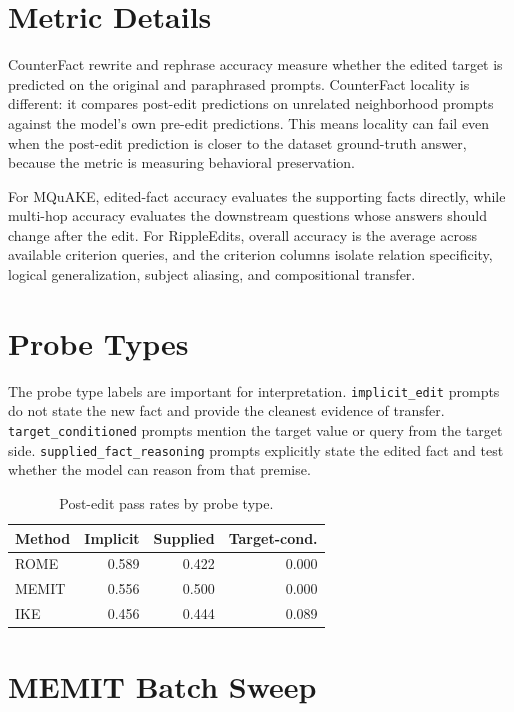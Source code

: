 \documentclass[11pt]{article}
\begin{document}
\appendix

\section{Metric Details}

CounterFact rewrite and rephrase accuracy measure whether the edited target is predicted on the original and paraphrased prompts. CounterFact locality is different: it compares post-edit predictions on unrelated neighborhood prompts against the model's own pre-edit predictions. This means locality can fail even when the post-edit prediction is closer to the dataset ground-truth answer, because the metric is measuring behavioral preservation.

For MQuAKE, edited-fact accuracy evaluates the supporting facts directly, while multi-hop accuracy evaluates the downstream questions whose answers should change after the edit. For RippleEdits, overall accuracy is the average across available criterion queries, and the criterion columns isolate relation specificity, logical generalization, subject aliasing, and compositional transfer.

\section{Probe Types}

The probe type labels are important for interpretation. \texttt{implicit\_edit} prompts do not state the new fact and provide the cleanest evidence of transfer. \texttt{target\_conditioned} prompts mention the target value or query from the target side. \texttt{supplied\_fact\_reasoning} prompts explicitly state the edited fact and test whether the model can reason from that premise.

\begin{table}[h]
\centering
\small
\begin{tabular*}{\columnwidth}{@{\extracolsep{\fill}}lrrr@{}}
\toprule
Method & Implicit & Supplied & Target-cond. \\
\midrule
ROME & 0.589 & 0.422 & 0.000 \\
MEMIT & 0.556 & 0.500 & 0.000 \\
IKE & 0.456 & 0.444 & 0.089 \\
\bottomrule
\end{tabular*}
\caption{Post-edit pass rates by probe type.}
\label{tab:probe-types}
\end{table}

\section{MEMIT Batch Sweep}
\end{document}
